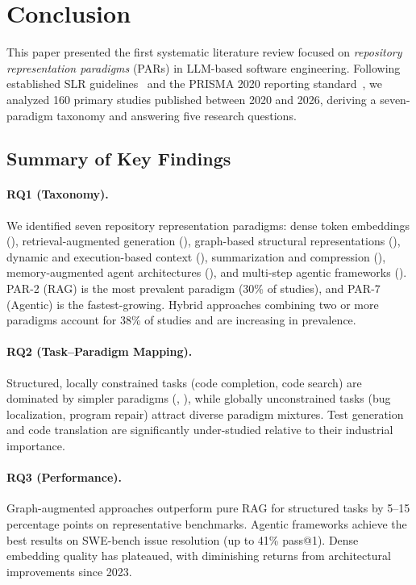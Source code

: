 \section{Conclusion}
\label{sec:conclusion}

This paper presented the first systematic literature review focused on \emph{repository
representation paradigms} (PARs) in LLM-based software engineering. Following established SLR
guidelines~\cite{kitchenham2007guidelines} and the PRISMA 2020 reporting standard~\cite{page2021prisma},
we analyzed 160 primary studies published between 2020 and 2026, deriving a seven-paradigm
taxonomy and answering five research questions.

\subsection{Summary of Key Findings}

\paragraph{RQ1 (Taxonomy).}
We identified seven repository representation paradigms: dense token embeddings (),
retrieval-augmented generation (), graph-based structural representations (),
dynamic and execution-based context (), summarization and compression (),
memory-augmented agent architectures (), and multi-step agentic frameworks ().
PAR-2 (RAG) is the most prevalent paradigm (30\% of studies), and PAR-7 (Agentic) is the
fastest-growing. Hybrid approaches combining two or more paradigms account for 38\% of studies
and are increasing in prevalence.

\paragraph{RQ2 (Task--Paradigm Mapping).}
Structured, locally constrained tasks (code completion, code search) are dominated by simpler
paradigms (, ), while globally unconstrained tasks (bug localization,
program repair) attract diverse paradigm mixtures. Test generation and code translation are
significantly under-studied relative to their industrial importance.

\paragraph{RQ3 (Performance).}
Graph-augmented approaches outperform pure RAG for structured tasks by 5--15 percentage points
on representative benchmarks. Agentic frameworks achieve the best results on SWE-bench issue
resolution (up to 41\% pass@1). Dense embedding quality has plateaued, with diminishing
returns from architectural improvements since 2023.

